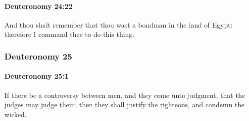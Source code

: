 		\paragraph{Deuteronomy 24:22} %
			\label{DEUTERONOMY-24-22}

			And thou shalt remember that thou wast a bondman in the land of Egypt: therefore I command thee to do this thing.

	\subsubsection{Deuteronomy 25} %
		\label{DEUTERONOMY-25}

		\paragraph{Deuteronomy 25:1} %
			\label{DEUTERONOMY-25-1}

			If there be a controversy between men, and they come unto judgment, that the judges may judge them; then they shall justify the righteous, and condemn the wicked.


